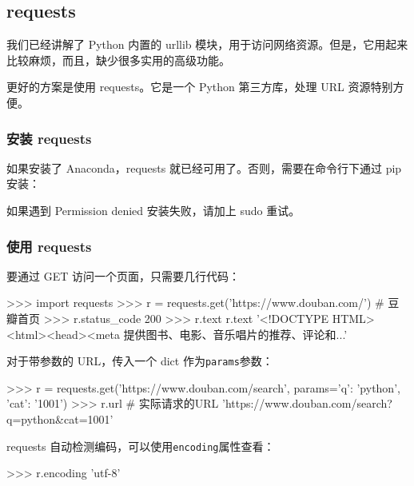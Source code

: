 \hypertarget{requests}{%
\subsection{requests}\label{requests}}

我们已经讲解了 Python 内置的 urllib
模块，用于访问网络资源。但是，它用起来比较麻烦，而且，缺少很多实用的高级功能。

更好的方案是使用 requests。它是一个 Python 第三方库，处理 URL
资源特别方便。

\hypertarget{ux5b89ux88c5-requests}{%
\subsubsection{安装 requests}\label{ux5b89ux88c5-requests}}

如果安装了 Anaconda，requests 就已经可用了。否则，需要在命令行下通过 pip
安装：


如果遇到 Permission denied 安装失败，请加上 sudo 重试。

\hypertarget{ux4f7fux7528-requests}{%
\subsubsection{使用 requests}\label{ux4f7fux7528-requests}}

要通过 GET 访问一个页面，只需要几行代码：

\begin{pythoncode}
>>> import requests
>>> r = requests.get('https://www.douban.com/') # 豆瓣首页
>>> r.status_code
200
>>> r.text
r.text
'<!DOCTYPE HTML>\n<html>\n<head>\n<meta 提供图书、电影、音乐唱片的推荐、评论和...'
\end{pythoncode}

对于带参数的 URL，传入一个 dict 作为\texttt{params}参数：

\begin{pythoncode}
>>> r = requests.get('https://www.douban.com/search', params={'q': 'python', 'cat': '1001'})
>>> r.url # 实际请求的URL
'https://www.douban.com/search?q=python&cat=1001'
\end{pythoncode}

requests 自动检测编码，可以使用\texttt{encoding}属性查看：

\begin{pythoncode}
>>> r.encoding
'utf-8'
\end{pythoncode}

